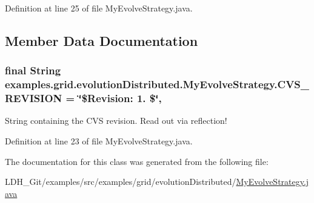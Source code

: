 Definition at line 25 of file My\-Evolve\-Strategy.\-java.



\subsection{Member Data Documentation}
\hypertarget{classexamples_1_1grid_1_1evolution_distributed_1_1_my_evolve_strategy_ab14e55275997407ffb5c7c64024f2654}{
\subsubsection[{C\-V\-S\-\_\-\-R\-E\-V\-I\-S\-I\-O\-N}]{\setlength{\rightskip}{0pt plus 5cm}final String examples.\-grid.\-evolution\-Distributed.\-My\-Evolve\-Strategy.\-C\-V\-S\-\_\-\-R\-E\-V\-I\-S\-I\-O\-N = \char`\"{}\$Revision\-: 1. \$\char`\"{}\hspace{0.3cm}{\ttfamily [static]}, {\ttfamily [private]}}}\label{classexamples_1_1grid_1_1evolution_distributed_1_1_my_evolve_strategy_ab14e55275997407ffb5c7c64024f2654}
String containing the C\-V\-S revision. Read out via reflection! 

Definition at line 23 of file My\-Evolve\-Strategy.\-java.



The documentation for this class was generated from the following file\-:\begin{DoxyCompactItemize}
\item 
L\-D\-H\-\_\-\-Git/examples/src/examples/grid/evolution\-Distributed/\hyperlink{evolution_distributed_2_my_evolve_strategy_8java}{My\-Evolve\-Strategy.\-java}\end{DoxyCompactItemize}
